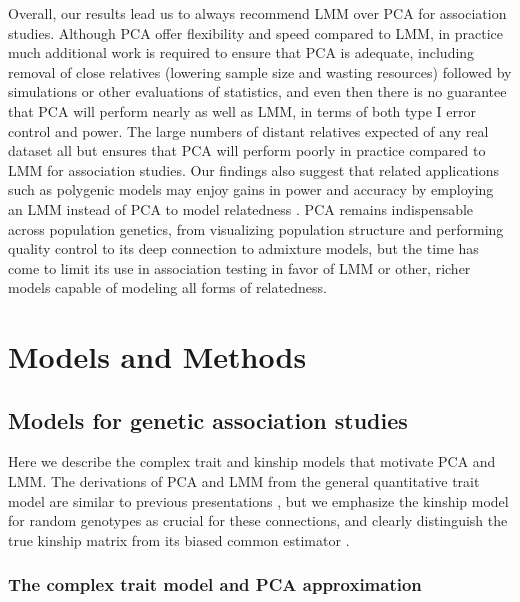 \documentclass[11pt]{article}
\begin{document}
Overall, our results lead us to always recommend LMM over PCA for association studies.
Although PCA offer flexibility and speed compared to LMM, in practice much additional work is required to ensure that PCA is adequate, including removal of close relatives (lowering sample size and wasting resources) followed by simulations or other evaluations of statistics, and even then there is no guarantee that PCA will perform nearly as well as LMM, in terms of both type I error control and power.
The large numbers of distant relatives expected of any real dataset all but ensures that PCA will perform poorly in practice compared to LMM for association studies.
Our findings also suggest that related applications such as polygenic models may enjoy gains in power and accuracy by employing an LMM instead of PCA to model relatedness \citep{rakitsch_lasso_2013,qian_fast_2020}.
PCA remains indispensable across population genetics, from visualizing population structure and performing quality control to its deep connection to admixture models, but the time has come to limit its use in association testing in favor of LMM or other, richer models capable of modeling all forms of relatedness.

\section{Models and Methods}

\subsection{Models for genetic association studies}

Here we describe the complex trait and kinship models that motivate PCA and LMM.
The derivations of PCA and LMM from the general quantitative trait model are similar to previous presentations \citep{astle_population_2009, hoffman_correcting_2013}, but we emphasize the kinship model for random genotypes as crucial for these connections, and clearly distinguish the true kinship matrix from its biased common estimator \citep{ochoa_estimating_2021, ochoa_human}.

\subsubsection{The complex trait model and PCA approximation}
\end{document}
